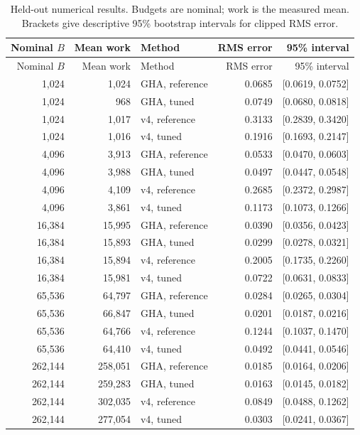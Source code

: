 \begin{longtable}{rrlrr}
\caption{Held-out numerical results. Budgets are nominal; work is the measured mean. Brackets give descriptive 95\% bootstrap intervals for clipped RMS error.}\\
\toprule Nominal $B$ & Mean work & Method & RMS error & 95\% interval\\\midrule
\endfirsthead
\toprule Nominal $B$ & Mean work & Method & RMS error & 95\% interval\\\midrule
\endhead
1,024 & 1,024 & GHA, reference & 0.0685 & [0.0619, 0.0752] \\
1,024 & 968 & GHA, tuned & 0.0749 & [0.0680, 0.0818] \\
1,024 & 1,017 & v4, reference & 0.3133 & [0.2839, 0.3420] \\
1,024 & 1,016 & v4, tuned & 0.1916 & [0.1693, 0.2147] \\
4,096 & 3,913 & GHA, reference & 0.0533 & [0.0470, 0.0603] \\
4,096 & 3,988 & GHA, tuned & 0.0497 & [0.0447, 0.0548] \\
4,096 & 4,109 & v4, reference & 0.2685 & [0.2372, 0.2987] \\
4,096 & 3,861 & v4, tuned & 0.1173 & [0.1073, 0.1266] \\
16,384 & 15,995 & GHA, reference & 0.0390 & [0.0356, 0.0423] \\
16,384 & 15,893 & GHA, tuned & 0.0299 & [0.0278, 0.0321] \\
16,384 & 15,894 & v4, reference & 0.2005 & [0.1735, 0.2260] \\
16,384 & 15,981 & v4, tuned & 0.0722 & [0.0631, 0.0833] \\
65,536 & 64,797 & GHA, reference & 0.0284 & [0.0265, 0.0304] \\
65,536 & 66,847 & GHA, tuned & 0.0201 & [0.0187, 0.0216] \\
65,536 & 64,766 & v4, reference & 0.1244 & [0.1037, 0.1470] \\
65,536 & 64,410 & v4, tuned & 0.0492 & [0.0441, 0.0546] \\
262,144 & 258,051 & GHA, reference & 0.0185 & [0.0164, 0.0206] \\
262,144 & 259,283 & GHA, tuned & 0.0163 & [0.0145, 0.0182] \\
262,144 & 302,035 & v4, reference & 0.0849 & [0.0488, 0.1262] \\
262,144 & 277,054 & v4, tuned & 0.0303 & [0.0241, 0.0367] \\
\bottomrule
\end{longtable}
